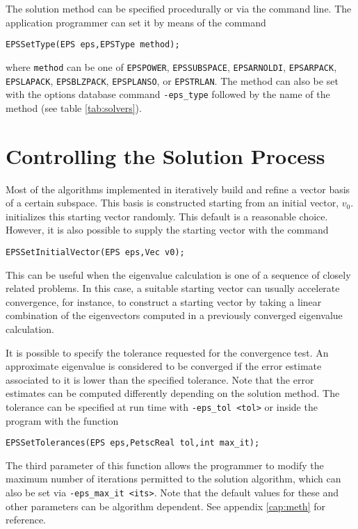 The solution method can be specified procedurally or via the command line. The application programmer can set it by means of the command
	\begin{Verbatim}[fontsize=\small]
	EPSSetType(EPS eps,EPSType method);
	\end{Verbatim}
where \texttt{method} can be one of 
\texttt{EPSPOWER}, 
\texttt{EPSSUBSPACE},
\texttt{EPSARNOLDI},
\texttt{EPSARPACK},
\texttt{EPSLAPACK},
\texttt{EPSBLZPACK},
\texttt{EPSPLANSO}, or
\texttt{EPSTRLAN}.
The  method can also be set with the options database command \Verb!-eps_type! followed by the name of the method (see table \ref{tab:solvers}).

\section{Controlling the Solution Process}

	Most of the algorithms implemented in \slepc iteratively build and refine a vector basis of a certain subspace. This basis is constructed starting from an initial vector, $v_0$.  initializes this starting vector randomly. This default is a reasonable choice. However, it is also possible to supply the starting vector with the command
	\begin{Verbatim}[fontsize=\small]
	EPSSetInitialVector(EPS eps,Vec v0);
	\end{Verbatim}
This can be useful when the eigenvalue calculation is one of a sequence of closely related problems. In this case, a suitable starting vector can usually accelerate convergence, for instance, to construct a starting vector by taking a linear combination of the eigenvectors computed in a previously converged eigenvalue calculation.

	It is possible to specify the tolerance requested for the convergence test. An approximate eigenvalue is considered to be converged if the error estimate associated to it is lower than the specified tolerance. Note that the error estimates can be computed differently depending on the solution method. The tolerance can be specified at run time with \Verb!-eps_tol <tol>! or inside the program with the function
	\begin{Verbatim}[fontsize=\small]
	EPSSetTolerances(EPS eps,PetscReal tol,int max_it);
	\end{Verbatim}
	The third parameter of this function allows the programmer to modify the maximum number of iterations permitted to the solution algorithm, which can also be set via \Verb!-eps_max_it <its>!. Note that the default values for these and other parameters can be algorithm dependent. See appendix \ref{cap:meth} for reference.


